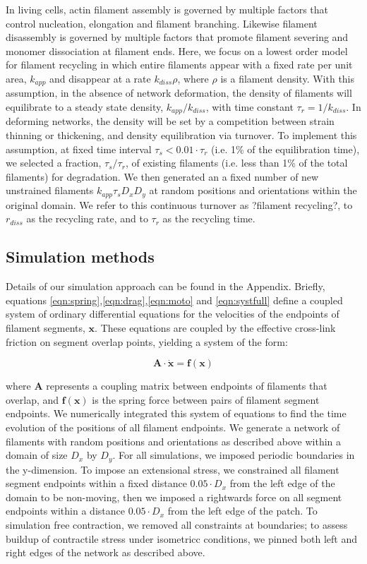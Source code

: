 \documentclass[10pt,letterpaper]{article}
\begin{document}
In living cells, actin filament assembly is governed by multiple factors that control nucleation, elongation and filament branching. Likewise filament disassembly is governed by multiple factors that promote filament severing and monomer dissociation at filament ends. Here, we focus on a lowest order model for filament recycling in which entire filaments appear with a fixed rate per unit area, $k_{app}$ and disappear at a rate $k_{diss}\rho$, where $\rho$ is a filament density. With this assumption, in the absence of network deformation, the density of filaments will equilibrate to a steady state density, $k_{app}/k_{diss}$, with time constant $\tau_r = 1/k_{diss}$.   In deforming networks, the density will be set by a competition between strain thinning or thickening, and density equilibration via turnover. To implement this assumption, at fixed time interval $\tau_s < 0.01\cdot\tau_r$ (i.e. 1\% of the equilibration time), we selected a fraction, $\tau_s/\tau_r$, of existing filaments (i.e. less than 1\% of the total filaments) for degradation. We then generated an a fixed number of new unstrained filaments $k_{app}\tau_sD_xD_y$ at random positions and orientations within the original domain.   We refer to this continuous turnover as ?filament recycling?, to $r_{diss}$ as the recycling rate, and to $\tau_r$ as the recycling time.


\subsection*{Simulation methods}

Details of our simulation approach can be found in the Appendix. Briefly, equations \ref{eqn:spring},\ref{eqn:drag},\ref{eqn:moto} and \ref{eqn:systfull} define a coupled system of ordinary differential equations for the velocities of the endpoints of filament segments, $\mathbf{x}$.  These equations are coupled by the effective cross-link friction on segment overlap points, yielding a system of the form:

\begin{equation}
\mathbf{A \cdot \dot x} = \mathbf{f(x)}
\end{equation}

where $\mathbf{A }$ represents a coupling matrix between endpoints of filaments that overlap, and $\mathbf{f(x)}$ is the spring force between pairs of filament segment endpoints.   We numerically integrated this system of equations to find the time evolution of the positions of all filament endpoints. We generate a network of filaments with random positions and orientations as described above within a domain of size $D_x$ by $D_y$.  For all simulations, we imposed periodic boundaries in the y-dimension. To impose an extensional stress, we constrained all filament segment endpoints within a fixed distance $0.05\cdot D_x$ from the left edge of the domain to be non-moving, then we imposed a rightwards force on all segment endpoints within a distance $0.05\cdot D_x$ from the left edge of the patch.   To simulation free contraction, we removed all constraints at boundaries; to assess buildup of contractile stress under isometricc conditions, we pinned both left and right edges of the network as described above.
\end{document}
